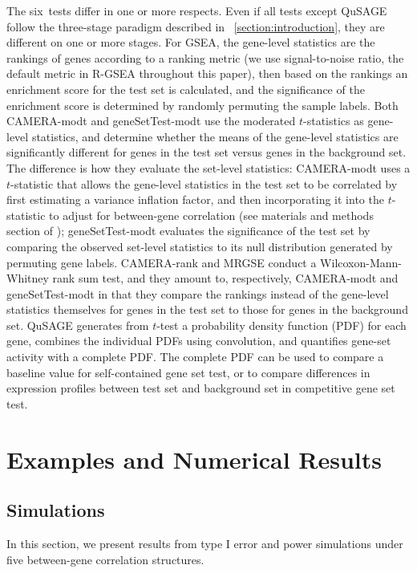 \documentclass[useAMS,usenatbib, galley]{biom}
\newcommand{\HowmanyTest}{six}
\begin{document}
	The \HowmanyTest~tests differ in one or more respects. Even if all tests except QuSAGE follow the three-stage paradigm described in ~\ref{section:introduction}, they are different on one or more stages. For GSEA, the gene-level statistics are the rankings of genes according to a ranking metric (we use signal-to-noise ratio, the default metric in R-GSEA throughout this paper), then based on the rankings an enrichment score for the test set is calculated, and the significance of the enrichment score is determined by randomly permuting the sample labels. Both CAMERA-modt and geneSetTest-modt use the moderated $t$-statistics \citep{Smyth2004moderated} as gene-level statistics, and determine whether the means of the gene-level statistics are significantly different for genes in the test set versus genes in the background set. The difference is how they evaluate the set-level statistics: CAMERA-modt uses a $t$-statistic that allows the gene-level statistics in the test set to be correlated by first estimating a variance inflation factor, and then incorporating it into the $t$-statistic to adjust for between-gene correlation (see materials and methods section of \cite{wu2012camera}); geneSetTest-modt evaluates the significance of the test set by comparing the observed set-level statistics to its null distribution generated by permuting gene labels. CAMERA-rank and MRGSE conduct a Wilcoxon-Mann-Whitney rank sum test, and they amount to, respectively,  CAMERA-modt and geneSetTest-modt in that they compare the rankings instead of the gene-level statistics themselves for genes in the test set to those for genes in the background set. QuSAGE generates from $t$-test a probability density function (PDF) for each gene, combines the individual PDFs using convolution, and quantifies gene-set activity with a complete PDF. The complete PDF can be used to compare a baseline value for self-contained gene set test, or to compare differences in expression profiles between test set and background set in competitive gene set test.  
	
	
	
	\section{Examples and Numerical Results}\label{section:results}
	
	\subsection{Simulations}\label{subsection:simulation}
	In this section, we present results from type I error and power simulations under five between-gene correlation structures.
	
\end{document}
